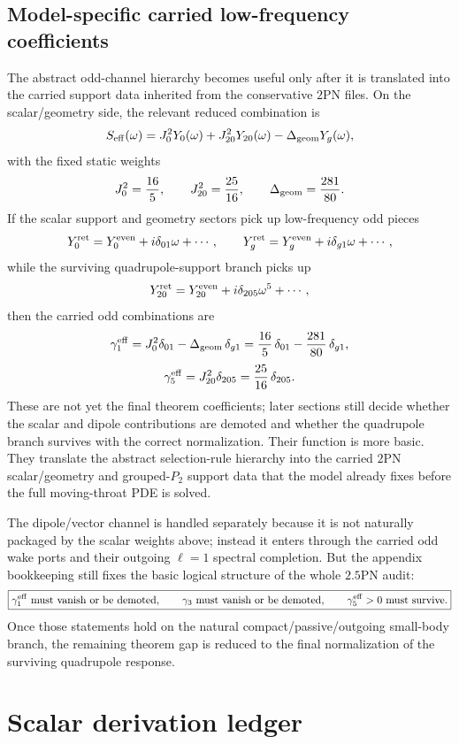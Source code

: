 \documentclass[11pt]{article}
\begin{document}
\subsection{Model-specific carried low-frequency coefficients}
\label{app:lowfreq-model-specific}

The abstract odd-channel hierarchy becomes useful only after it is translated
into the carried support data inherited from the conservative $2$PN files.  On
the scalar/geometry side, the relevant reduced combination is
\[
S_{\rm eff}(\omega)
=
J_0^2Y_0(\omega)+J_{20}^2Y_{20}(\omega)-\Delta_{\rm geom}Y_g(\omega),
\]
with the fixed static weights
\[
J_0^2=\frac{16}{5},
\qquad
J_{20}^2=\frac{25}{16},
\qquad
\Delta_{\rm geom}=\frac{281}{80}.
\]
If the scalar support and geometry sectors pick up low-frequency odd pieces
\[
Y_0^{\rm ret}=Y_0^{\rm even}+i\delta_{01}\omega+\cdots,
\qquad
Y_g^{\rm ret}=Y_g^{\rm even}+i\delta_{g1}\omega+\cdots,
\]
while the surviving quadrupole-support branch picks up
\[
Y_{20}^{\rm ret}=Y_{20}^{\rm even}+i\delta_{205}\omega^5+\cdots,
\]
then the carried odd combinations are
\[
\gamma_1^{\rm eff}
=
J_0^2\delta_{01}-\Delta_{\rm geom}\,\delta_{g1}
=
\frac{16}{5}\,\delta_{01}-\frac{281}{80}\,\delta_{g1},
\]
\[
\gamma_5^{\rm eff}
=
J_{20}^2\delta_{205}
=
\frac{25}{16}\,\delta_{205}.
\]
These are not yet the final theorem coefficients; later sections still decide
whether the scalar and dipole contributions are demoted and whether the
quadrupole branch survives with the correct normalization.  Their function is
more basic.  They translate the abstract selection-rule hierarchy into the
carried $2$PN scalar/geometry and grouped-$P_2$ support data that the model
already fixes before the full moving-throat PDE is solved.

The dipole/vector channel is handled separately because it is not naturally
packaged by the scalar weights above; instead it enters through the carried odd
wake ports and their outgoing $\ell=1$ spectral completion.  But the appendix
bookkeeping still fixes the basic logical structure of the whole $2.5$PN audit:
\[
\boxed{
\gamma_1^{\rm eff}\ \text{must vanish or be demoted},\qquad
\gamma_3\ \text{must vanish or be demoted},\qquad
\gamma_5^{\rm eff}>0\ \text{must survive}.
}
\]
Once those statements hold on the natural compact/passive/outgoing small-body
branch, the remaining theorem gap is reduced to the final normalization of the
surviving quadrupole response.

\section{Scalar derivation ledger}
\label{app:scalar-derivation-ledger}
\end{document}
